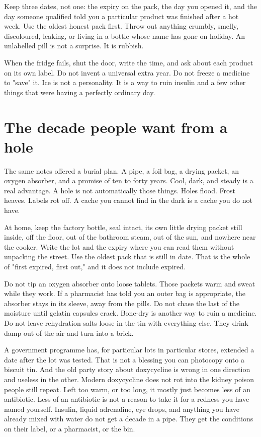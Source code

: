\documentclass[10pt,openright]{book}
\begin{document}
Keep three dates, not one: the expiry on the pack, the day you opened it, and the day someone qualified told you a particular product was finished after a hot week. Use the oldest honest pack first. Throw out anything crumbly, smelly, discoloured, leaking, or living in a bottle whose name has gone on holiday. An unlabelled pill is not a surprise. It is rubbish.

When the fridge fails, shut the door, write the time, and ask about each product on its own label. Do not invent a universal extra year. Do not freeze a medicine to "save" it. Ice is not a personality. It is a way to ruin insulin and a few other things that were having a perfectly ordinary day.

\section*{The decade people want from a hole}
The same notes offered a burial plan. A pipe, a foil bag, a drying packet, an oxygen absorber, and a promise of ten to forty years. Cool, dark, and steady is a real advantage. A hole is not automatically those things. Holes flood. Frost heaves. Labels rot off. A cache you cannot find in the dark is a cache you do not have.

At home, keep the factory bottle, seal intact, its own little drying packet still inside, off the floor, out of the bathroom steam, out of the sun, and nowhere near the cooker. Write the lot and the expiry where you can read them without unpacking the street. Use the oldest pack that is still in date. That is the whole of "first expired, first out," and it does not include expired.

Do not tip an oxygen absorber onto loose tablets. Those packets warm and sweat while they work. If a pharmacist has told you an outer bag is appropriate, the absorber stays in its sleeve, away from the pills. Do not chase the last of the moisture until gelatin capsules crack. Bone-dry is another way to ruin a medicine. Do not leave rehydration salts loose in the tin with everything else. They drink damp out of the air and turn into a brick.

A government programme has, for particular lots in particular stores, extended a date after the lot was tested. That is not a blessing you can photocopy onto a biscuit tin. And the old party story about doxycycline is wrong in one direction and useless in the other. Modern doxycycline does not rot into the kidney poison people still repeat. Left too warm, or too long, it mostly just becomes less of an antibiotic. Less of an antibiotic is not a reason to take it for a redness you have named yourself. Insulin, liquid adrenaline, eye drops, and anything you have already mixed with water do not get a decade in a pipe. They get the conditions on their label, or a pharmacist, or the bin.
\end{document}
